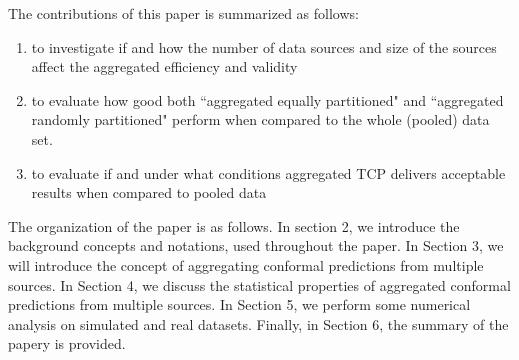 \documentclass[main]{subfiles}
\newcommand{\todo}[1]{{\color{blue} #1 }}
\begin{document}

The contributions of this paper is summarized as follows:

\begin{enumerate}
\item to investigate if and how the number of data sources and size of the sources affect the aggregated efficiency and validity

\item to evaluate how good both ``aggregated equally partitioned" and ``aggregated randomly partitioned" perform when compared to the whole (pooled) data set.

\item to evaluate if and under what conditions aggregated TCP delivers acceptable results when compared to pooled data



\end{enumerate}

The organization of the paper is as follows. In section 2, we introduce the background concepts and notations, used throughout the paper. In Section 3, we will introduce the concept of aggregating conformal predictions from multiple sources. In Section 4, we discuss the statistical properties of aggregated conformal predictions from multiple sources. In Section 5, we perform some numerical analysis on simulated and real datasets. Finally, in Section 6, the summary of the papery is provided.
\end{document}
